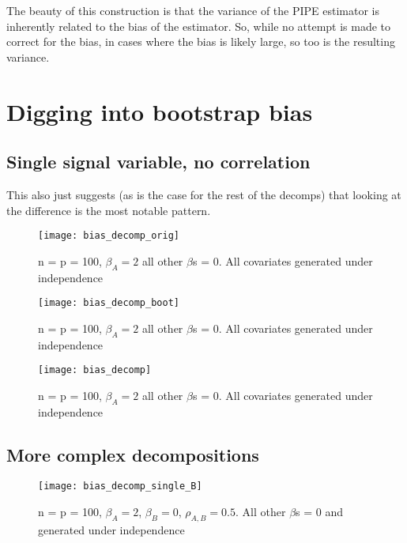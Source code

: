 The beauty of this construction is that the variance of the PIPE estimator is inherently related to the bias of the estimator. So, while no attempt is made to correct for the bias, in cases where the bias is likely large, so too is the resulting variance.

\section{Digging into bootstrap bias}

\subsection{Single signal variable, no correlation}

This also just suggests (as is the case for the rest of the decomps) that looking at the difference is the most notable pattern.

\begin{figure}[hbtp]
    \begin{center}
    \texttt{[image: bias\_decomp\_orig]}
    \caption{\label{Fig:bias_decomp_orig} n = p = 100, $\beta_A = 2$ all other $\beta$s = 0. All covariates generated under independence}
    \end{center}
\end{figure}

\begin{figure}[hbtp]
    \begin{center}
    \texttt{[image: bias\_decomp\_boot]}
    \caption{\label{Fig:bias_decomp_boot} n = p = 100, $\beta_A = 2$ all other $\beta$s = 0. All covariates generated under independence}
    \end{center}
\end{figure}

\begin{figure}[hbtp]
    \begin{center}
    \texttt{[image: bias\_decomp]}
    \caption{\label{Fig:bias_decomp} n = p = 100, $\beta_A = 2$ all other $\beta$s = 0. All covariates generated under independence}
    \end{center}
\end{figure}

\subsection{More complex decompositions}

\begin{figure}[hbtp]
    \begin{center}
    \texttt{[image: bias\_decomp\_single\_B]}
    \caption{\label{Fig:bias_decomp_single_B} n = p = 100, $\beta_A = 2$, $\beta_B = 0$, $\rho_{A,B} = 0.5$.  All other $\beta$s = 0 and  generated under independence}
    \end{center}
\end{figure}

